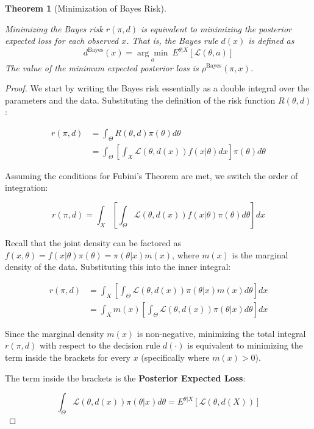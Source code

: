 \documentclass[
  letterpaper,
  DIV=11,
  numbers=noendperiod]{scrreprt}
\renewcommand{\[}{\begin{equation}}
\renewcommand{\]}{\end{equation}}
\theoremstyle{definition}
\theoremstyle{plain}
\theoremstyle{plain}
\theoremstyle{plain}
\newtheorem{theorem}{Theorem}[chapter]
\theoremstyle{definition}
\theoremstyle{plain}
\theoremstyle{remark}
\begin{document}
\begin{theorem}[Minimization of Bayes
Risk]\protect\hypertarget{thm-bayes-rule-minimization}{}\label{thm-bayes-rule-minimization}

Minimizing the Bayes risk \(r(\pi, d)\) is equivalent to minimizing the
posterior expected loss for each observed \(x\). That is, the Bayes rule
\(d(x)\) is defined as \[
d^{\text{Bayes}}(x) = \underset{a}{\arg\min} \ E^{\theta|X} [ \mathcal{L}(\theta, a) ]
\] The value of the minimum expected posterior loss is
\(\rho^{\text{Bayes}}(\pi, x)\).

\end{theorem}

\begin{proof}
We start by writing the Bayes risk essentially as a double integral over
the parameters and the data. Substituting the definition of the risk
function \(R(\theta, d)\):

\[
\begin{aligned}
r(\pi, d) &= \int_{\Theta} R(\theta, d) \pi(\theta) d\theta \\
&= \int_{\Theta} \left[ \int_{X} \mathcal{L}(\theta, d(x)) f(x|\theta) dx \right] \pi(\theta) d\theta
\end{aligned}
\]

Assuming the conditions for Fubini's Theorem are met, we switch the
order of integration:

\[
r(\pi, d) = \int_{X} \left[ \int_{\Theta} \mathcal{L}(\theta, d(x)) f(x|\theta) \pi(\theta) d\theta \right] dx
\]

Recall that the joint density can be factored as
\(f(x, \theta) = f(x|\theta)\pi(\theta) = \pi(\theta|x)m(x)\), where
\(m(x)\) is the marginal density of the data. Substituting this into the
inner integral:

\[
\begin{aligned}
r(\pi, d) &= \int_{X} \left[ \int_{\Theta} \mathcal{L}(\theta, d(x)) \pi(\theta|x) m(x) d\theta \right] dx \\
&= \int_{X} m(x) \left[ \int_{\Theta} \mathcal{L}(\theta, d(x)) \pi(\theta|x) d\theta \right] dx
\end{aligned}
\]

Since the marginal density \(m(x)\) is non-negative, minimizing the
total integral \(r(\pi, d)\) with respect to the decision rule
\(d(\cdot)\) is equivalent to minimizing the term inside the brackets
for every \(x\) (specifically where \(m(x) > 0\)).

The term inside the brackets is the \textbf{Posterior Expected Loss}:

\[
\int_{\Theta} \mathcal{L}(\theta, d(x)) \pi(\theta|x) d\theta = E^{\theta|X} [ \mathcal{L}(\theta, d(X)) ]
\]
\end{proof}
\end{document}
